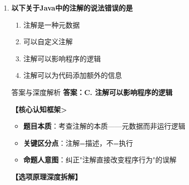 \documentclass[12pt, a4paper]{ctexart}
\begin{document}
\begin{enumerate}[label=\textbf{\arabic*.}]
\begin{bluebox}{答案与深度解析}
		      \textbf{【应背诵知识点>}
		      \begin{itemize}[label={}, nosep]
			      \item System.getProperties()返回Properties对象
			      \item Properties存储键值对，支持load/store
			      \item Runtime用于执行命令、内存管理
			      \item 选项辨析：系统属性用Properties，执行命令用Runtime
		      \end{itemize}

		      \textbf{【命题趋势与实战策略】}

		      \textbf{考场秒杀}：获取系统属性→Properties
		      \textbf{高频陷阱}：Properties是类名和返回类型
		      \textbf{记忆口诀}：System取属性得Properties，Runtime做命令
	      \end{bluebox}

	      \vspace{1em}

	\item \textbf{以下关于Java中的注解的说法错误的是}
	      \begin{enumerate}[label=\Alph*.]
		      \item 注解是一种元数据
		      \item 可以自定义注解
		      \item 注解可以影响程序的逻辑
		      \item 注解可以为代码添加额外的信息
	      \end{enumerate}

	      \begin{bluebox}{答案与深度解析}
		      \textbf{答案：C. 注解可以影响程序的逻辑}

		      \textbf{【核心认知框架>}
		      \begin{itemize}[label={}, leftmargin=*, nosep]
			      \item \textbf{题目本质}：考查注解的本质——元数据而非运行逻辑
			      \item \textbf{关键区分点}：注解=描述，不=执行
			      \item \textbf{命题人意图}：纠正"注解直接改变程序行为"的误解
		      \end{itemize}

		      \textbf{【选项原理深度拆解】}


\end{bluebox}
\end{enumerate}
\end{document}
